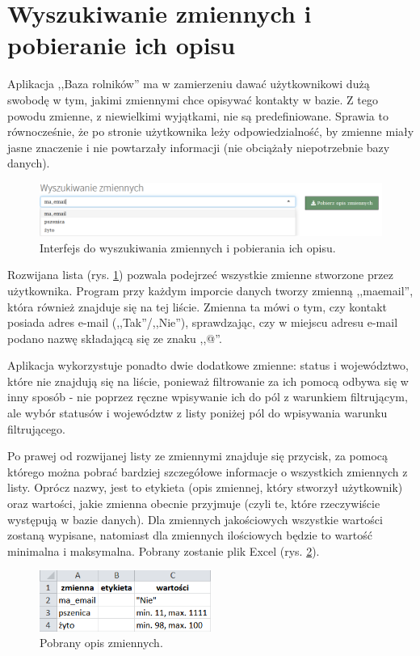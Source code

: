 \documentclass[12pt, twoside, hidelinks]{report}
\begin{document}
\section{Wyszukiwanie zmiennych i pobieranie ich opisu}
Aplikacja ,,Baza rolników'' ma w zamierzeniu dawać użytkownikowi dużą swobodę w tym, jakimi zmiennymi chce opisywać kontakty w bazie. Z tego powodu zmienne, z niewielkimi wyjątkami, nie są predefiniowane. Sprawia to równocześnie, że po stronie użytkownika leży odpowiedzialność, by zmienne miały jasne znaczenie i nie powtarzały informacji (nie obciążały niepotrzebnie bazy danych). \par
\begin{figure}[h!]
\includegraphics[width = 1\textwidth]{1.1.}
\caption{Interfejs do wyszukiwania zmiennych i pobierania ich opisu.}
\label{wyszukiwanie_zmiennych_i_pobieranie_ich_opisu_interfejs}
\end{figure}
Rozwijana lista (rys. \ref{wyszukiwanie_zmiennych_i_pobieranie_ich_opisu_interfejs}) pozwala podejrzeć wszystkie zmienne stworzone przez użytkownika. Program przy każdym imporcie danych tworzy zmienną ,,ma\textunderscore email'', która również znajduje się na tej liście. Zmienna ta mówi o tym, czy kontakt posiada adres e-mail (,,Tak''/,,Nie''), sprawdzając, czy w miejscu adresu e-mail podano nazwę składającą się ze znaku ,,@''. \par
Aplikacja wykorzystuje ponadto dwie dodatkowe zmienne: status i województwo, które nie znajdują się na liście, ponieważ filtrowanie za ich pomocą odbywa się w inny sposób - nie poprzez ręczne wpisywanie ich do pól z warunkiem filtrującym, ale wybór statusów i województw z listy poniżej pól do wpisywania warunku filtrującego. \par
Po prawej od rozwijanej listy ze zmiennymi znajduje się przycisk, za pomocą którego można pobrać bardziej szczegółowe informacje o wszystkich zmiennych z listy. Oprócz nazwy, jest to etykieta (opis zmiennej, który stworzył użytkownik) oraz wartości, jakie zmienna obecnie przyjmuje (czyli te, które rzeczywiście występują w bazie danych). Dla zmiennych jakościowych wszystkie wartości zostaną wypisane, natomiast dla zmiennych ilościowych będzie to wartość minimalna i maksymalna. Pobrany zostanie plik Excel (rys. \ref{pobrany_opis_zmiennych}).
\begin{figure}[h!]
\includegraphics[width = 0.5\textwidth]{1.5.}
\centering
\caption{Pobrany opis zmiennych.}
\label{pobrany_opis_zmiennych}
\end{figure}
\end{document}

